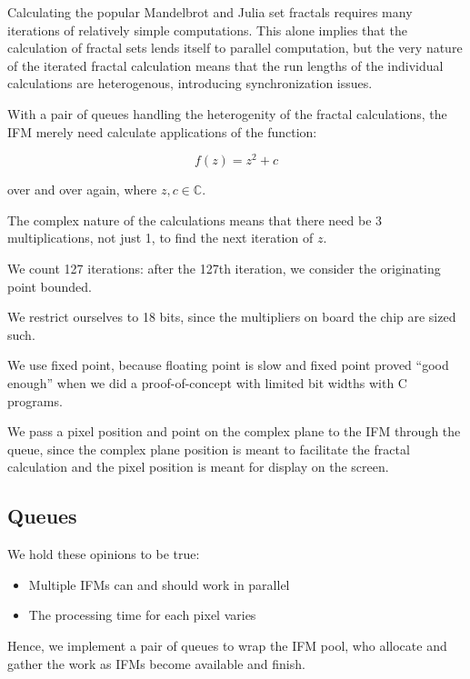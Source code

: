 \documentclass{article}
\begin{document}
Calculating the popular Mandelbrot and Julia set fractals requires
many iterations of relatively simple computations. This alone implies
that the calculation of fractal sets lends itself to parallel
computation, but the very nature of the iterated fractal calculation
means that the run lengths of the individual calculations are
heterogenous, introducing synchronization issues.

With a pair of queues handling the heterogenity of the fractal
calculations, the IFM merely need calculate applications of the function:

\begin{equation}
f(z) = z^2 + c
\end{equation}

over and over again, where $z,c \in \mathbb{C}$.


The complex nature of the calculations means that there need be 3
multiplications, not just 1, to find the next iteration of $z$.

We count 127 iterations: after the 127th iteration, we consider the
originating point bounded.

We restrict ourselves to 18 bits, since the multipliers on board the
chip are sized such.

We use fixed point, because floating point is slow and fixed point
proved ``good enough'' when we did a proof-of-concept with limited bit
widths with C programs.

We pass a pixel position and point on the complex plane to the IFM
through the queue, since the complex plane position is meant to
facilitate the fractal calculation and the pixel position is meant for
display on the screen.

\subsection{Queues}

We hold these opinions to be true:

\begin{itemize}
\item Multiple IFMs can and should work in parallel
\item The processing time for each pixel varies
\end{itemize}

Hence, we implement a pair of queues to wrap the IFM pool, who
allocate and gather the work as IFMs become available and finish.
\end{document}
